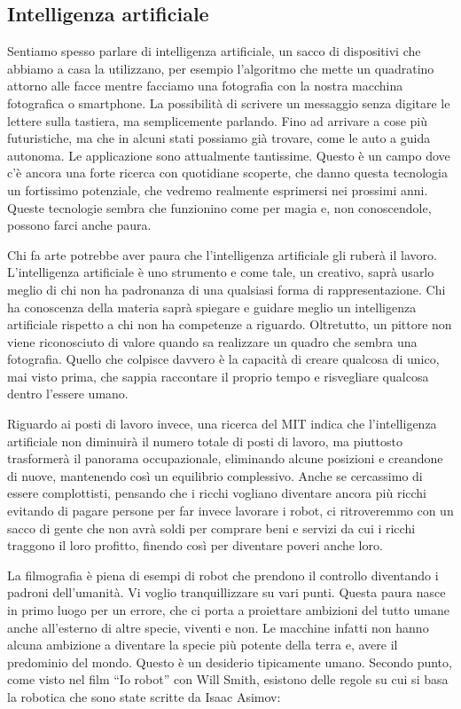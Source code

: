 \documentclass[12pt]{book} %
\begin{document}
\subsection{Intelligenza artificiale}
Sentiamo spesso parlare di intelligenza artificiale, un sacco di dispositivi che abbiamo a casa la utilizzano, per
esempio l'algoritmo che mette un quadratino attorno alle facce mentre facciamo una fotografia con
la nostra macchina fotografica o smartphone. La possibilità di scrivere un messaggio senza digitare le lettere sulla
tastiera, ma semplicemente parlando. Fino ad arrivare a cose più futuristiche, ma che in alcuni stati possiamo già
trovare, come le auto a guida autonoma. Le applicazione sono attualmente tantissime. Questo è un campo dove
c'è ancora una forte ricerca con quotidiane scoperte, che danno questa tecnologia un fortissimo
potenziale, che vedremo realmente esprimersi nei prossimi anni. Queste tecnologie sembra che funzionino come per magia
e, non conoscendole, possono farci anche paura. 

Chi fa arte potrebbe aver paura che l'intelligenza artificiale gli ruberà il lavoro. L'intelligenza artificiale è uno strumento e come tale, un creativo, saprà usarlo meglio di chi non ha padronanza di una qualsiasi forma di rappresentazione. Chi ha conoscenza della materia saprà spiegare e guidare meglio un intelligenza artificiale rispetto a chi non ha competenze a riguardo. Oltretutto, un pittore non viene riconosciuto di valore quando sa realizzare un quadro che sembra una fotografia. Quello che colpisce davvero è la capacità di creare qualcosa di unico, mai visto prima, che sappia raccontare il proprio tempo e risvegliare qualcosa dentro l'essere umano.

Riguardo ai posti di lavoro invece, una ricerca del MIT indica che l'intelligenza artificiale non diminuirà il numero totale di posti di lavoro, ma piuttosto trasformerà il panorama occupazionale, eliminando alcune posizioni e creandone di nuove, mantenendo così un equilibrio complessivo.
Anche se cercassimo di essere complottisti, pensando che i ricchi vogliano diventare ancora più ricchi evitando di pagare persone per far invece lavorare i robot, ci ritroveremmo con un sacco di gente che non avrà soldi per comprare beni e servizi da cui i ricchi traggono il loro profitto, finendo così per diventare poveri anche loro.

La filmografia è piena di esempi di robot che prendono il controllo
diventando i padroni dell'umanità. Vi voglio tranquillizzare su vari punti. Questa paura nasce in
primo luogo per un errore, che ci porta a proiettare ambizioni del tutto umane anche all'esterno
di altre specie, viventi e non. Le macchine infatti non hanno alcuna ambizione a diventare la specie più potente della
terra e, avere il predominio del mondo. Questo è un desiderio tipicamente umano. Secondo punto, come visto nel film “Io
robot” con Will Smith, esistono delle regole su cui si basa la robotica che sono state scritte da Isaac Asimov:
\end{document}

